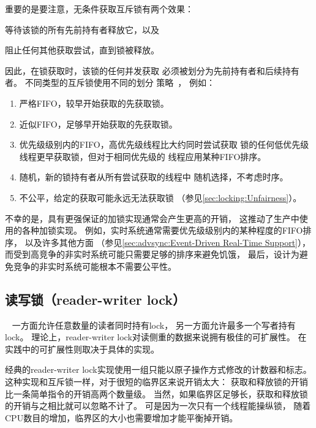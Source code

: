 \QuickQuizLabel{\QlockingQemptycriticalsection}

重要的是要注意，无条件获取互斥锁有两个效果：
\begin{enumerate*}[(1)]
\item 等待该锁的所有先前持有者释放它，以及
\item 阻止任何其他获取尝试，直到锁被释放。
\end{enumerate*}
因此，在锁获取时，该锁的任何并发获取
必须被划分为先前持有者和后续持有者。
不同类型的互斥锁使用不同的划分
策略~\cite{BjoernBrandenburgPhD,Guerraoui:2019:LPA:3319851.3301501}，
例如：

\begin{enumerate}
\item	严格FIFO，较早开始获取的先获取锁。
\item	近似FIFO，足够早开始获取的先获取锁。
\item	优先级级别内的FIFO，高优先级线程比大约同时尝试获取
	锁的任何低优先级线程更早获取锁，但对于相同优先级的
	线程应用某种FIFO排序。
\item	随机，新的锁持有者从所有尝试获取的线程中
	随机选择，不考虑时序。
\item
	不公平，给定的获取可能永远无法获取锁
	（参见\cref{sec:locking:Unfairness}）。
\end{enumerate}

不幸的是，具有更强保证的加锁实现通常会产生更高的开销，
这推动了生产中使用的各种加锁实现。
例如，实时系统通常需要优先级级别内的某种程度的FIFO排序，
以及许多其他方面
（参见\cref{sec:advsync:Event-Driven Real-Time Support}），
而受到高竞争的非实时系统可能只需要足够的排序来避免饥饿，
最后，设计为避免竞争的非实时系统可能根本不需要公平性。

\subsection{读写锁（reader-writer lock）}
\label{sec:locking:Reader-Writer Locks}

~\cite{Courtois71}
一方面允许任意数量的读者同时持有lock，
另一方面允许最多一个写者持有lock。
理论上，reader-writer lock对读侧重的数据来说拥有极佳的可扩展性。
在实践中的可扩展性则取决于具体的实现。

经典的reader-writer lock实现使用一组只能以原子操作方式修改的计数器和标志。
这种实现和互斥锁一样，对于很短的临界区来说开销太大：
获取和释放锁的开销比一条简单指令的开销高两个数量级。
当然，如果临界区足够长，获取和释放锁的开销与之相比就可以忽略不计了。
可是因为一次只有一个线程能操纵锁，
随着CPU数目的增加，临界区的大小也需要增加才能平衡掉开销。

